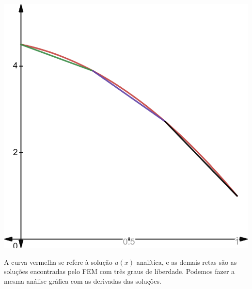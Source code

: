 \documentclass[12pt]{scrartcl}
\begin{document}
\begin{center}
    \includegraphics[scale=0.25]{grafico_zoom_ux_AA03.png}
\end{center}

A curva vermelha se refere à solução $u(x)$ analítica, e as demais retas são as soluções encontradas pelo FEM com três graus de liberdade.
\newline 
Podemos fazer a mesma análise gráfica com as derivadas das soluções.
\end{document}
